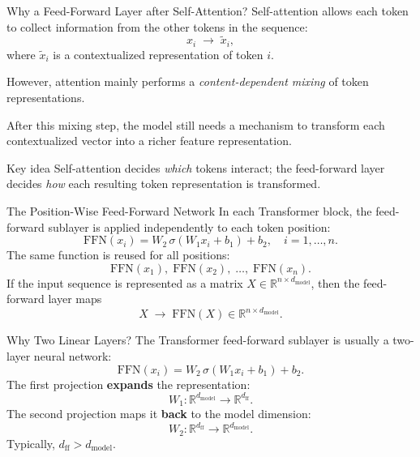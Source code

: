 \documentclass[aspectratio=169]{beamer}
\begin{document}
\begin{frame}{Why a Feed-Forward Layer after Self-Attention?}
  Self-attention allows each token to collect information from the other tokens in the
  sequence:
  \[
    x_i \;\longrightarrow\; \tilde{x}_i,
  \]
  where $\tilde{x}_i$ is a contextualized representation of token $i$.

  \vspace{0.4em}
  However, attention mainly performs a \emph{content-dependent mixing} of token
  representations.

  After this mixing step, the model still needs a mechanism to transform each
  contextualized vector into a richer feature representation.

  \vspace{0.4em}
  \begin{block}{Key idea}
    Self-attention decides \emph{which} tokens interact; the feed-forward layer decides
    \emph{how} each resulting token representation is transformed.
  \end{block}
\end{frame}
%
%
\begin{frame}{The Position-Wise Feed-Forward Network}
  In each Transformer block, the feed-forward sublayer is applied independently to
  each token position:
  \[
    \mathrm{FFN}(x_i) = W_2\,\sigma(W_1 x_i + b_1) + b_2,
    \quad i = 1, \ldots, n.
  \]
  The same function is reused for all positions:
  \[
    \mathrm{FFN}(x_1),\;\mathrm{FFN}(x_2),\;\ldots,\;\mathrm{FFN}(x_n).
  \]
  If the input sequence is represented as a matrix
  $X \in \mathbb{R}^{n \times d_{\mathrm{model}}}$,
  then the feed-forward layer maps
  \[
    X \;\longrightarrow\; \mathrm{FFN}(X) \in \mathbb{R}^{n \times d_{\mathrm{model}}}.
  \]
\end{frame}
%
%
\begin{frame}{Why Two Linear Layers?}
  The Transformer feed-forward sublayer is usually a two-layer neural network:
  \[
    \mathrm{FFN}(x_i) = W_2\,\sigma(W_1 x_i + b_1) + b_2.
  \]
  The first projection \textbf{expands} the representation:
  \[
    W_1: \mathbb{R}^{d_{\mathrm{model}}} \to \mathbb{R}^{d_{\mathrm{ff}}}.
  \]
  The second projection maps it \textbf{back} to the model dimension:
  \[
    W_2: \mathbb{R}^{d_{\mathrm{ff}}} \to \mathbb{R}^{d_{\mathrm{model}}}.
  \]
  Typically, $d_{\mathrm{ff}} > d_{\mathrm{model}}$.
\end{frame}
\end{document}
